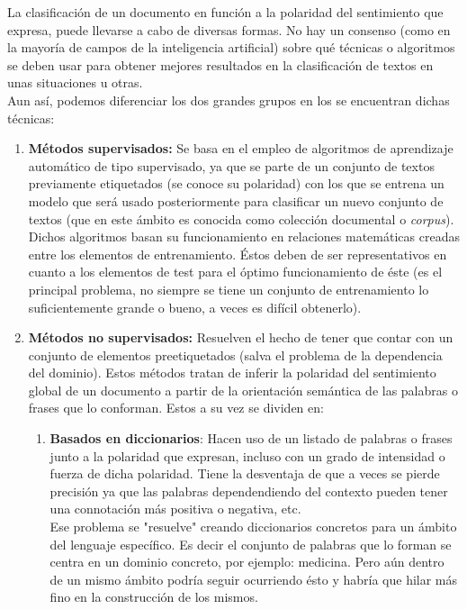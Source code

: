 \documentclass[a4paper,12pt]{report}
\begin{document}
La clasificación de un documento en función a la polaridad del sentimiento que expresa, puede llevarse a cabo de diversas formas. No hay un consenso (como en la mayoría de campos de la inteligencia artificial) sobre qué técnicas o algoritmos se deben usar para obtener mejores resultados en la clasificación de textos en unas situaciones u otras. 
\vspace{2mm}\\
Aun así, podemos diferenciar los dos grandes grupos en los se encuentran dichas técnicas:

\begin{enumerate}

\item \textbf{Métodos supervisados:} Se basa en el empleo de algoritmos de aprendizaje automático de tipo supervisado, ya que se parte de un conjunto de textos previamente etiquetados (se conoce su polaridad) con los que se entrena un modelo que será usado posteriormente para clasificar un nuevo conjunto de textos (que en este ámbito es conocida como colección documental o \textit{corpus}). 
\vspace{2mm}\\
Dichos algoritmos basan su funcionamiento en relaciones matemáticas creadas entre los elementos de entrenamiento. Éstos deben de ser representativos en cuanto a los elementos de test para el óptimo funcionamiento de éste (es el principal problema, no siempre se tiene un conjunto de entrenamiento lo suficientemente grande o bueno, a veces es difícil obtenerlo).


\item \textbf{Métodos no supervisados:} Resuelven el hecho de tener que contar con un conjunto de elementos preetiquetados (salva el problema de la dependencia del dominio). Estos métodos tratan de inferir la polaridad del sentimiento global de un documento a partir de la orientación semántica de las palabras o frases que lo conforman. Estos a su vez se dividen en: 

	\begin{enumerate}

	\item \textbf{Basados en diccionarios}: Hacen uso de un listado de palabras o frases junto a la polaridad que expresan, incluso con un grado de intensidad o fuerza de dicha polaridad. Tiene la desventaja de que a veces se pierde precisión ya que las palabras dependendiendo del contexto pueden tener una connotación más positiva o negativa, etc.
	\vspace{2mm}\\
	Ese problema se "resuelve" creando diccionarios concretos para un ámbito del lenguaje específico. Es decir el conjunto de palabras que lo forman se centra en un dominio concreto, por ejemplo: medicina. Pero aún dentro de un mismo ámbito podría seguir ocurriendo ésto y habría que hilar más fino en la construcción de los mismos.
	

\end{enumerate}
\end{enumerate}
\end{document}
